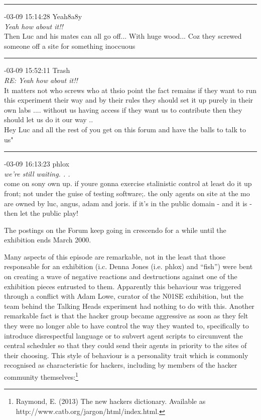 \begin{mail}
\rule{0.8\textwidth}{.4pt}

{-03-09 15:14:28 Yeah8a8y}\\
{\itshape Yeah how about it!!}\\
Then Luc and his mates can all go off... With huge wood... Coz they screwed someone off a site for something inoccuous\\


\rule{0.8\textwidth}{.4pt}


{-03-09 15:52:11 Trash}\\
{\itshape RE: Yeah how about it!!}\\
It matters not who screws who at thsio point the fact remains if they want to run this experiment their way and by their rules they should set it up purely in their own labs .... without us having access if they want us to contribute then they should let us do it our way ..\\
Hey Luc and all the rest of you get on this forum and have the balls to talk to us"\\

\rule{0.8\textwidth}{.4pt}

{-03-09 16:13:23 phlox}\\
{\itshape we're still waiting. . .}\\
come on sony own up. if youre gonna exercise stalinistic control at least do it up front; not under the guise of testing software;. the only agents on site at the mo are owned by luc, angus, adam and joris. if it's in the public domain - and it is -  then let the public play!

\end{mail}
\clearpage
The postings on the Forum keep going in crescendo for a while until the exhibition ends March 2000. 

Many aspects of this episode are remarkable, not in the least that those responsable for an 
exhibition (i.c. Denna Jones (i.e. phlox) and ``fish'') were bent on creating a wave of negative reactions and 
destructions against one of the exhibition pieces entrusted to them. Apparently this behaviour was triggered through
a conflict 
with Adam Lowe, curator of the N01SE exhibition, but the team behind the Talking Heads experiment had nothing to do 
with this. Another remarkable fact is that the hacker group 
became aggressive as soon as they felt they were no longer able to have control the way they wanted to, specifically 
to introduce disrespectful language or to subvert agent scripts to circumvent the central scheduler so that they 
could send their agents in priority to the sites of their choosing.
This style of behaviour is a personality trait which is commonly recognised as characteristic for 
hackers, including by members of the hacker community themselves:\footnote{
Raymond, E. (2013) The new hackers dictionary. Available as http://www.catb.org/jargon/html/index.html.}


